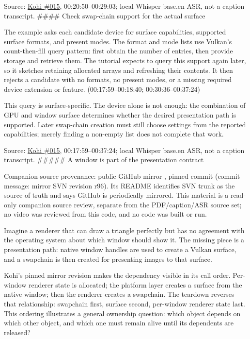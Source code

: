 Source: \href{https://www.youtube.com/watch?v=6Kj3O2Ov1RU}{Kohi \#015}, 00:20:50--00:29:03; local Whisper base.en ASR, not a caption transcript. \#\#\#\# Check swap-chain support for the actual surface

The example asks each candidate device for surface capabilities, supported surface formats, and present modes. The format and mode lists use Vulkan's count-then-fill query pattern: first obtain the number of entries, then provide storage and retrieve them. The tutorial expects to query this support again later, so it sketches retaining allocated arrays and refreshing their contents. It then rejects a candidate with no formats, no present modes, or a missing required device extension or feature. (00:17:59--00:18:40; 00:30:36--00:37:24)

This query is surface-specific. The device alone is not enough: the combination of GPU and window surface determines whether the desired presentation path is supported. Later swap-chain creation must still choose settings from the reported capabilities; merely finding a non-empty list does not complete that work.

Source: \href{https://www.youtube.com/watch?v=6Kj3O2Ov1RU}{Kohi \#015}, 00:17:59--00:37:24; local Whisper base.en ASR, not a caption transcript. \#\#\#\#\# A window is part of the presentation contract

Companion-source provenance: public GitHub mirror , pinned commit  (commit message: mirror SVN revision r96). Its README identifies SVN trunk as the source of truth and says GitHub is periodically mirrored. This material is a read-only companion source review, separate from the PDF/caption/ASR source set; no video was reviewed from this code, and no code was built or run.

Imagine a renderer that can draw a triangle perfectly but has no agreement with the operating system about which window should show it. The missing piece is a presentation path: native window handles are used to create a Vulkan surface, and a swapchain is then created for presenting images to that surface.

Kohi's pinned mirror revision makes the dependency visible in its call order. Per-window renderer state is allocated; the platform layer creates a surface from the native window; then the renderer creates a swapchain. The teardown reverses that relationship: swapchain first, surface second, per-window renderer state last. This ordering illustrates a general ownership question: which object depends on which other object, and which one must remain alive until its dependents are released?

